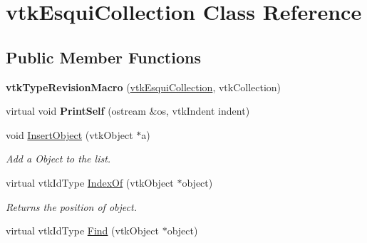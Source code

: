 \hypertarget{classvtkEsquiCollection}{
\section{vtkEsquiCollection Class Reference}
\label{classvtkEsquiCollection}
}
\subsection*{Public Member Functions}
\begin{DoxyCompactItemize}
\item 
\hypertarget{classvtkEsquiCollection_a0bc9e0fa5c22339133504d09cb668da6}{
{\bfseries vtkTypeRevisionMacro} (\hyperlink{classvtkEsquiCollection}{vtkEsquiCollection}, vtkCollection)}
\label{classvtkEsquiCollection_a0bc9e0fa5c22339133504d09cb668da6}

\item 
\hypertarget{classvtkEsquiCollection_a4392d0a697f05f1d7cba2b91190ae219}{
virtual void {\bfseries PrintSelf} (ostream \&os, vtkIndent indent)}
\label{classvtkEsquiCollection_a4392d0a697f05f1d7cba2b91190ae219}

\item 
\hypertarget{classvtkEsquiCollection_a1fcd619e41651523c20de58bccbeeaa4}{
void \hyperlink{classvtkEsquiCollection_a1fcd619e41651523c20de58bccbeeaa4}{InsertObject} (vtkObject $\ast$a)}
\label{classvtkEsquiCollection_a1fcd619e41651523c20de58bccbeeaa4}

\begin{DoxyCompactList}\small\item\em Add a Object to the list. \item\end{DoxyCompactList}\item 
\hypertarget{classvtkEsquiCollection_a293e38813ade93e5e850d9be9fc0d98e}{
virtual vtkIdType \hyperlink{classvtkEsquiCollection_a293e38813ade93e5e850d9be9fc0d98e}{IndexOf} (vtkObject $\ast$object)}
\label{classvtkEsquiCollection_a293e38813ade93e5e850d9be9fc0d98e}

\begin{DoxyCompactList}\small\item\em Returns the position of object. \item\end{DoxyCompactList}\item 
\hypertarget{classvtkEsquiCollection_a93ead8f14422c9cf3d8d3e028653def3}{
virtual vtkIdType \hyperlink{classvtkEsquiCollection_a93ead8f14422c9cf3d8d3e028653def3}{Find} (vtkObject $\ast$object)}
\label{classvtkEsquiCollection_a93ead8f14422c9cf3d8d3e028653def3}


\end{DoxyCompactItemize}
